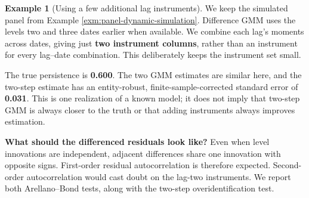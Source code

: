 \documentclass[
  11pt,
]{book}
\theoremstyle{definition}
\theoremstyle{definition}
\newtheorem{example}{Example}[chapter]
\theoremstyle{definition}
\theoremstyle{definition}
\theoremstyle{remark}
\begin{document}
\begin{example}[Using a few additional lag instruments]
\protect\hypertarget{exm:panel-dynamic-gmm}{}\label{exm:panel-dynamic-gmm}We keep the simulated panel from Example \ref{exm:panel-dynamic-simulation}. Difference GMM uses the levels two and three dates earlier when available. We combine each lag's moments across dates, giving just \textbf{two instrument columns}, rather than an instrument for every lag--date combination. This deliberately keeps the instrument set small.

\begin{table}[H]
\centering\begingroup\fontsize{10}{12}\selectfont

\endgroup{}
\end{table}

The true persistence is \textbf{0.600}. The two GMM estimates are similar here, and the two-step estimate has an entity-robust, finite-sample-corrected standard error of \textbf{0.031}. This is one realization of a known model; it does not imply that two-step GMM is always closer to the truth or that adding instruments always improves estimation.

\textbf{What should the differenced residuals look like?} Even when level innovations are independent, adjacent differences share one innovation with opposite signs. First-order residual autocorrelation is therefore expected. Second-order autocorrelation would cast doubt on the lag-two instruments. We report both Arellano--Bond tests, along with the two-step overidentification test.

\begin{table}[H]
\centering\begingroup\fontsize{10}{12}\selectfont

\endgroup{}
\end{table}


\end{example}
\end{document}
